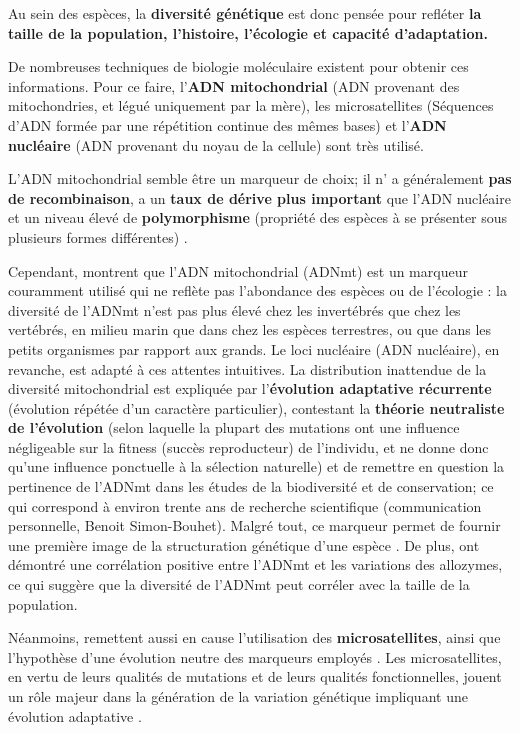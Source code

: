 \documentclass[a4paper,11pt,twoside]{report}
\begin{document}
Au sein des espèces, la \textbf{diversité génétique} est donc pensée pour refléter \textbf{la taille de la population, l'histoire, l'écologie et capacité d'adaptation.} 

De nombreuses techniques de biologie moléculaire existent pour obtenir ces informations. Pour ce faire, l'\textbf{ADN mitochondrial} (ADN provenant des mitochondries, et légué uniquement par la mère), les microsatellites (Séquences d'ADN formée par une répétition continue des mêmes bases) et l'\textbf{ADN nucléaire} (ADN provenant du noyau de la cellule) sont très utilisé. 

L'ADN mitochondrial semble être un marqueur de choix; il n' a généralement \textbf{pas de recombinaison}, a un \textbf{taux de dérive plus important} que l'ADN nucléaire et un niveau élevé de \textbf{polymorphisme} (propriété des espèces à se présenter sous plusieurs formes différentes) \citep{avise2000abandon,aurelle2009aa}. 

Cependant, \citep{bazin2006population} montrent que l'ADN mitochondrial (ADNmt) est un marqueur couramment utilisé qui ne reflète pas l'abondance des espèces ou de l'écologie : la diversité de l'ADNmt n'est pas plus élevé chez les invertébrés que chez les vertébrés, en milieu marin que dans chez les espèces terrestres, ou que dans les petits organismes par rapport aux grands. Le loci nucléaire (ADN nucléaire), en revanche, est adapté à ces attentes intuitives. La distribution inattendue de la diversité mitochondrial est expliquée par l'\textbf{évolution adaptative récurrente} (évolution répétée d'un caractère particulier), contestant la \textbf{théorie neutraliste de l'évolution} (selon laquelle la plupart des mutations ont une influence négligeable sur la fitness (succès reproducteur) de l'individu, et ne donne donc qu'une influence ponctuelle à la sélection naturelle) et de remettre en question la pertinence de l'ADNmt dans les études de la biodiversité et de conservation; ce qui correspond à environ trente ans de recherche scientifique (communication personnelle, Benoit Simon-Bouhet). Malgré tout, ce marqueur permet de fournir une première image de la structuration génétique d'une espèce \citep{aurelle2009aa}. De plus, \citep{kitchen2008three} ont démontré une corrélation positive entre l'ADNmt et les variations des allozymes, ce qui suggère que la diversité de l'ADNmt peut corréler avec la taille de la population.

Néanmoins, \citep{kashi2006simple} remettent aussi en cause l'utilisation des \textbf{microsatellites}, ainsi que l'hypothèse d'une évolution neutre des marqueurs employés \citep{aurelle2009aa}. Les microsatellites, en vertu de leurs qualités de mutations et de leurs qualités fonctionnelles, jouent un rôle majeur dans la génération de la variation génétique impliquant une évolution adaptative \citep{kashi2006simple}.
\end{document}
